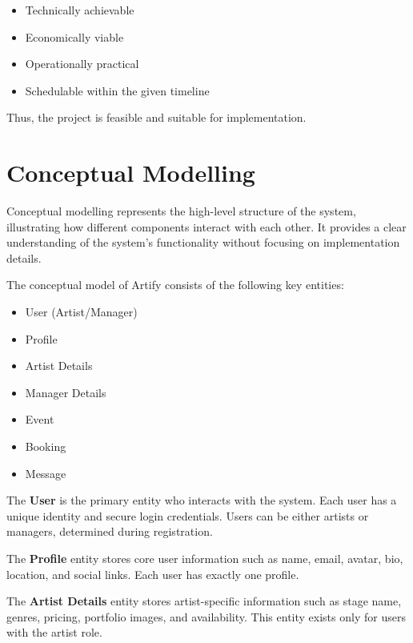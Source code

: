 \documentclass[12pt,a4paper]{report}
\begin{document}
\begin{itemize}
\item Technically achievable

\item Economically viable

\item Operationally practical

\item Schedulable within the given timeline
\end{itemize}

Thus, the project is feasible and suitable for implementation.

\section{Conceptual Modelling}
Conceptual modelling represents the high-level structure of the system, illustrating how different components interact with each other. It provides a clear understanding of the system's functionality without focusing on implementation details.

The conceptual model of Artify consists of the following key entities:

\begin{itemize}
\item User (Artist/Manager)

\item Profile

\item Artist Details

\item Manager Details

\item Event

\item Booking

\item Message
\end{itemize}

The \textbf{User} is the primary entity who interacts with the system. Each user has a unique identity and secure login credentials. Users can be either artists or managers, determined during registration.

The \textbf{Profile} entity stores core user information such as name, email, avatar, bio, location, and social links. Each user has exactly one profile.

The \textbf{Artist Details} entity stores artist-specific information such as stage name, genres, pricing, portfolio images, and availability. This entity exists only for users with the artist role.
\end{document}
